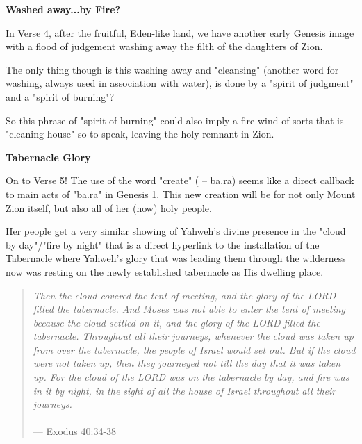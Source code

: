 \documentclass[11pt]{article}
\begin{document}
\vspace{3em}
{\large\bfseries Washed away...by Fire?}
\vspace{1em}

In Verse 4, after the fruitful, Eden-like land, we have another early Genesis image with a flood of judgement washing away the filth of the daughters of Zion.

{\vspace{1em}}

The only thing though is this washing away and "cleansing" (another word for washing, always used in association with water), is done by a "spirit of judgment" and a "spirit of burning"?

{\vspace{1em}}


So this phrase of "spirit of burning" could also imply a fire wind of sorts that is "cleaning house" so to speak, leaving the holy remnant in Zion.


\vspace{3em}
{\large\bfseries Tabernacle Glory}
\vspace{1em}



On to Verse 5! The use of the word "create" ( – ba.ra) seems like a direct callback to main acts of "ba.ra" in Genesis 1.
This new creation will be for not only Mount Zion itself, but also all of her (now) holy people.

{\vspace{1em}}

Her people get a very similar showing of Yahweh's divine presence in the "cloud by day"/"fire by night" that is a direct hyperlink to the installation of the Tabernacle where
Yahweh's glory that was leading them through the wilderness now was resting on the newly established tabernacle as His dwelling place.

\begin{quote}
\textit{
Then the cloud covered the tent of meeting, and the glory of the LORD filled the tabernacle.
And Moses was not able to enter the tent of meeting because the cloud settled on it, and the glory of the LORD filled the tabernacle. 
Throughout all their journeys, whenever the cloud was taken up from over the tabernacle, the people of Israel would set out. 
But if the cloud were not taken up, then they journeyed not till the day that it was taken up.
For the cloud of the LORD was on the tabernacle by day, and fire was in it by night, in the sight of all the house of Israel throughout all their journeys.
}
\\\\
\hfill --- Exodus 40:34-38
\end{quote}
\end{document}
